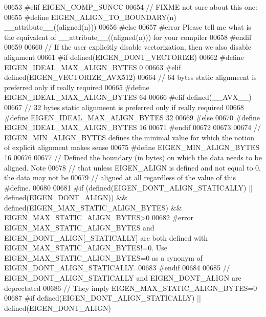 \begin{DoxyCode}
00653 \textcolor{preprocessor}{#elif EIGEN\_COMP\_SUNCC}
00654   \textcolor{comment}{// FIXME not sure about this one:}
00655 \textcolor{preprocessor}{  #define EIGEN\_ALIGN\_TO\_BOUNDARY(n) \_\_attribute\_\_((aligned(n)))}
00656 \textcolor{preprocessor}{#else}
00657 \textcolor{preprocessor}{  #error Please tell me what is the equivalent of \_\_attribute\_\_((aligned(n))) for your compiler}
00658 \textcolor{preprocessor}{#endif}
00659 
00660 \textcolor{comment}{// If the user explicitly disable vectorization, then we also disable alignment}
00661 \textcolor{preprocessor}{#if defined(EIGEN\_DONT\_VECTORIZE)}
00662 \textcolor{preprocessor}{  #define EIGEN\_IDEAL\_MAX\_ALIGN\_BYTES 0}
00663 \textcolor{preprocessor}{#elif defined(EIGEN\_VECTORIZE\_AVX512)}
00664   \textcolor{comment}{// 64 bytes static alignmeent is preferred only if really required}
00665 \textcolor{preprocessor}{  #define EIGEN\_IDEAL\_MAX\_ALIGN\_BYTES 64}
00666 \textcolor{preprocessor}{#elif defined(\_\_AVX\_\_)}
00667   \textcolor{comment}{// 32 bytes static alignmeent is preferred only if really required}
00668 \textcolor{preprocessor}{  #define EIGEN\_IDEAL\_MAX\_ALIGN\_BYTES 32}
00669 \textcolor{preprocessor}{#else}
00670 \textcolor{preprocessor}{  #define EIGEN\_IDEAL\_MAX\_ALIGN\_BYTES 16}
00671 \textcolor{preprocessor}{#endif}
00672 
00673 
00674 \textcolor{comment}{// EIGEN\_MIN\_ALIGN\_BYTES defines the minimal value for which the notion of explicit alignment makes sense}
00675 \textcolor{preprocessor}{#define EIGEN\_MIN\_ALIGN\_BYTES 16}
00676 
00677 \textcolor{comment}{// Defined the boundary (in bytes) on which the data needs to be aligned. Note}
00678 \textcolor{comment}{// that unless EIGEN\_ALIGN is defined and not equal to 0, the data may not be}
00679 \textcolor{comment}{// aligned at all regardless of the value of this #define.}
00680 
00681 \textcolor{preprocessor}{#if (defined(EIGEN\_DONT\_ALIGN\_STATICALLY) || defined(EIGEN\_DONT\_ALIGN))  &&
       defined(EIGEN\_MAX\_STATIC\_ALIGN\_BYTES) && EIGEN\_MAX\_STATIC\_ALIGN\_BYTES>0}
00682 \textcolor{preprocessor}{#error EIGEN\_MAX\_STATIC\_ALIGN\_BYTES and EIGEN\_DONT\_ALIGN[\_STATICALLY] are both defined with
       EIGEN\_MAX\_STATIC\_ALIGN\_BYTES!=0. Use EIGEN\_MAX\_STATIC\_ALIGN\_BYTES=0 as a synonym of EIGEN\_DONT\_ALIGN\_STATICALLY.}
00683 \textcolor{preprocessor}{#endif}
00684 
00685 \textcolor{comment}{// EIGEN\_DONT\_ALIGN\_STATICALLY and EIGEN\_DONT\_ALIGN are deprectated}
00686 \textcolor{comment}{// They imply EIGEN\_MAX\_STATIC\_ALIGN\_BYTES=0}
00687 \textcolor{preprocessor}{#if defined(EIGEN\_DONT\_ALIGN\_STATICALLY) || defined(EIGEN\_DONT\_ALIGN)}

\end{DoxyCode}
